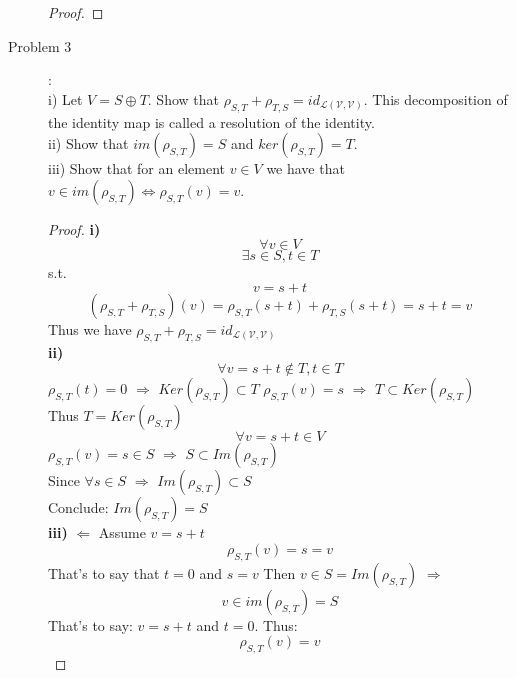 \documentclass{article}
\begin{document}
\begin{description}
\begin{proof}
\end{proof}


\item[Problem 3]:\\
i) Let $V = S\oplus T$. Show that $\rho_{S,T} + \rho_{T,S} = id_\mathcal{L(V, V)}$. This decomposition of the identity map is called a resolution of the identity.\\
ii) Show that $im(\rho_{S,T}) = S$ and $ker(\rho_{S,T}) = T$.\\
iii) Show that for an element $v\in V$ we have that $v\in im(\rho_{S,T})\Leftrightarrow\rho_{S,T}(v) = v$. 
\begin{proof}

	\textbf{i)}
		$$\forall v \in V$$
		$$\exists s\in S, t \in T$$
		s.t.
		$$ v = s + t $$
		$$(\rho_{S,T} + \rho_{T,S})(v) = \rho_{S,T}(s+t) + \rho_{T,S}(s+t) = s+t = v$$
		Thus we have $\rho_{S,T} + \rho_{T,S} = id_\mathcal{L(V, V)}$
	\\ \textbf{ii)}
		$$\forall v = s + t \notin T, t \in T$$
		$\rho_{S,T}(t) = 0 $ $\Rightarrow$	$Ker(\rho_{S, T}) \subset T$
		$\rho_{S,T}(v) = s $ $\Rightarrow$  $T \subset Ker(\rho_{S, T})$ \\
		Thus $T = Ker(\rho_{S, T})$ \\
		$$\forall v = s + t\in V$$
		$\rho_{S,T}(v) = s \in S$ $\Rightarrow$	 $S \subset Im(\rho_{S, T})$ \\
		Since $\forall s \in S$ $\Rightarrow$ $Im(\rho_{S, T}) \subset S$ \\
		Conclude: $Im(\rho_{S, T}) = S$
	\\ \textbf{iii)}
		\textbf{$\Leftarrow$}	
			Assume $v = s + t$
			$$ \rho_{S,T}(v) = s = v$$
			That's to say that $t = 0$ and $s = v$
			Then $v \in S = Im(\rho_{S,T})$
		\textbf{$\Rightarrow$}
			$$ v\in im(\rho_{S,T}) = S $$
			That's to say: $v = s + t$ and $t = 0$.
			Thus: $$ \rho_{S,T}(v) = v $$

\end{proof}



\end{description}
\end{document}
